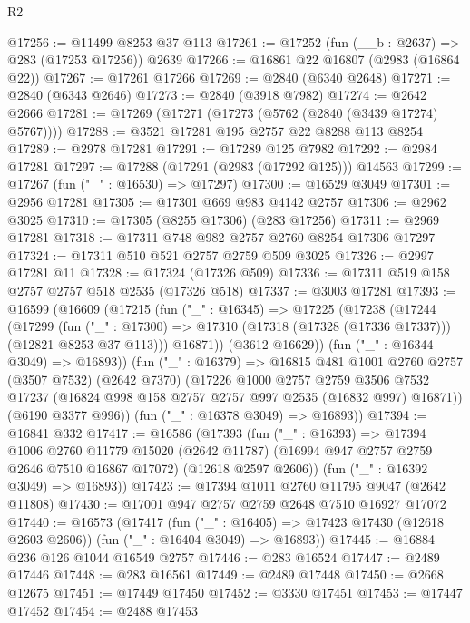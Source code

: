 \begin{lexlean}{R2}
\begin{coremodule}
@17256 := @11499 @8253 @37 @113
@17261 := @17252 (fun (__b : @2637) => @283 (@17253 @17256)) @2639
@17266 := @16861 @22 @16807 (@2983 (@16864 @22))
@17267 := @17261 @17266
@17269 := @2840 (@6340 @2648)
@17271 := @2840 (@6343 @2646)
@17273 := @2840 (@3918 @7982)
@17274 := @2642 @2666
@17281 := @17269 (@17271 (@17273 (@5762 (@2840 (@3439 @17274) @5767))))
@17288 := @3521 @17281 @195 @2757 @22 @8288 @113 @8254
@17289 := @2978 @17281
@17291 := @17289 @125 @7982
@17292 := @2984 @17281
@17297 := @17288 (@17291 (@2983 (@17292 @125))) @14563
@17299 := @17267 (fun ("_" : @16530) => @17297)
@17300 := @16529 @3049
@17301 := @2956 @17281
@17305 := @17301 @669 @983 @4142 @2757
@17306 := @2962 @3025
@17310 := @17305 (@8255 @17306) (@283 @17256)
@17311 := @2969 @17281
@17318 := @17311 @748 @982 @2757 @2760 @8254 @17306 @17297
@17324 := @17311 @510 @521 @2757 @2759 @509 @3025
@17326 := @2997 @17281 @11
@17328 := @17324 (@17326 @509)
@17336 := @17311 @519 @158 @2757 @2757 @518 @2535 (@17326 @518)
@17337 := @3003 @17281
@17393 := @16599
    (@16609
      (@17215
        (fun ("_" : @16345) =>
        @17225
          (@17238
            (@17244
              (@17299
                (fun ("_" : @17300) =>
                @17310 (@17318 (@17328 (@17336 @17337))) (@12821 @8253 @37 @113)))
              @16871))
          (@3612 @16629))
        (fun ("_" : @16344 @3049) => @16893))
      (fun ("_" : @16379) =>
      @16815
        @481
        @1001
        @2760
        @2757
        (@3507 @7532)
        (@2642 @7370)
        (@17226
          @1000
          @2757
          @2759
          @3506
          @7532
          @17237
          (@16824 @998 @158 @2757 @2757 @997 @2535 (@16832 @997) @16871))
        (@6190 @3377 @996))
      (fun ("_" : @16378 @3049) => @16893))
@17394 := @16841 @332
@17417 := @16586
    (@17393
      (fun ("_" : @16393) =>
      @17394
        @1006
        @2760
        @11779
        @15020
        (@2642 @11787)
        (@16994 @947 @2757 @2759 @2646 @7510 @16867 @17072)
        (@12618 @2597 @2606))
      (fun ("_" : @16392 @3049) => @16893))
@17423 := @17394 @1011 @2760 @11795 @9047 (@2642 @11808)
@17430 := @17001 @947 @2757 @2759 @2648 @7510 @16927 @17072
@17440 := @16573
    (@17417
      (fun ("_" : @16405) => @17423 @17430 (@12618 @2603 @2606))
      (fun ("_" : @16404 @3049) => @16893))
@17445 := @16884 @236 @126 @1044 @16549 @2757
@17446 := @283 @16524
@17447 := @2489 @17446
@17448 := @283 @16561
@17449 := @2489 @17448
@17450 := @2668 @12675
@17451 := @17449 @17450
@17452 := @3330 @17451
@17453 := @17447 @17452
@17454 := @2488 @17453

\end{coremodule}
\end{lexlean}
